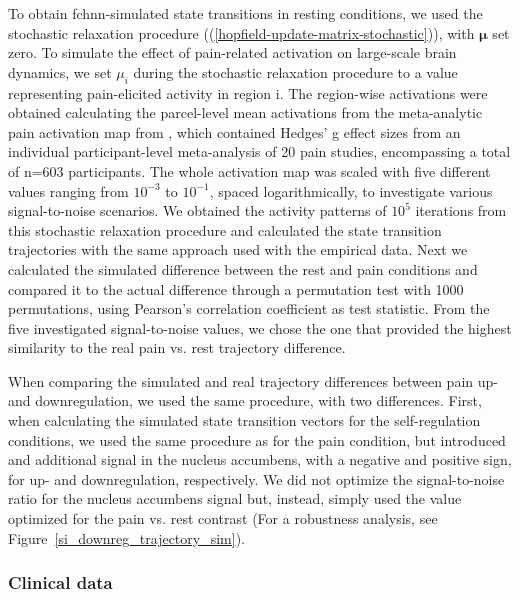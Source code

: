 \documentclass{article}
\begin{document}
To obtain \acrshort{fchnn}-simulated state transitions in resting conditions, we used the stochastic relaxation procedure ((\ref{hopfield-update-matrix-stochastic})), with $\mathbf{\mu}$ set zero.
To simulate the effect of pain-related activation on large-scale brain dynamics, we set $\mu_i$ during the stochastic relaxation procedure to a value representing pain-elicited activity in region i. The region-wise activations were obtained calculating the parcel-level mean activations from the meta-analytic pain activation map from \citep{zunhammer2021meta}, which contained Hedges' g effect sizes from an individual participant-level meta-analysis of 20 pain studies, encompassing a total of n=603 participants. The whole activation map was scaled with five different values ranging from $10^{ -3}$ to $10^{ -1}$, spaced logarithmically, to investigate various signal-to-noise scenarios.
We obtained the activity patterns of $10^5$ iterations from this stochastic relaxation procedure and calculated the state transition trajectories with the same approach used with the empirical data.
Next we calculated the simulated difference between the rest and pain conditions and compared it to the actual difference through a permutation test with 1000 permutations, using Pearson's correlation coefficient as test statistic.
From the five investigated signal-to-noise values, we chose the one that provided the highest similarity to the real pain vs. rest trajectory difference.

When comparing the simulated and real trajectory differences between pain up- and downregulation, we used the same procedure, with two differences. First, when calculating the simulated state transition vectors for the self-regulation conditions, we used the same procedure as for the pain condition, but introduced and additional signal in the nucleus accumbens, with a negative and positive sign, for  up- and downregulation, respectively. We did not optimize the signal-to-noise ratio for the nucleus accumbens signal but, instead, simply used the value optimized for the pain vs. rest contrast (For a robustness analysis, see Figure~\ref{si_downreg_trajectory_sim}).

\subsubsection{Clinical data}
\end{document}
